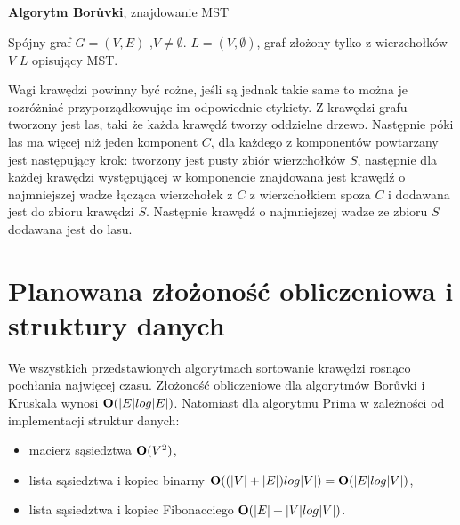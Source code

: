 \documentclass[a4paper, 10pt]{article}
\begin{document}
	
\begin{algorithm}
\caption{{\bf Algorytm Borůvki}, znajdowanie MST}
\begin{algorithmic}[!h]
\REQUIRE Spójny graf $G=(V,E)$ ,$V \neq \emptyset$. 
\ENSURE $L=(V,\emptyset)$, graf złożony tylko z wierzchołków $V$
\STATE {}
\STATE {}
\ENDFOR 
\ENDWHILE
\RETURN $L$ opisujący MST.
\end{algorithmic}
\end{algorithm}

\FloatBarrier

Wagi krawędzi powinny być rożne, jeśli są jednak takie same to można je rozróżniać przyporządkowując im odpowiednie etykiety.
Z krawędzi grafu tworzony jest las, taki że każda krawędź tworzy oddzielne drzewo. Następnie póki las ma więcej niż jeden komponent $C$, dla każdego
z komponentów powtarzany jest następujący krok: tworzony jest pusty zbiór wierzchołków $S$, następnie dla każdej krawędzi występującej w komponencie znajdowana
jest krawędź o najmniejszej wadze łącząca wierzchołek z $C$ z wierzchołkiem spoza $C$ i dodawana jest do zbioru krawędzi $S$. Następnie krawędź o najmniejszej wadze ze zbioru
$S$ dodawana jest do lasu.
\section{Planowana złożoność obliczeniowa i struktury danych}

We wszystkich przedstawionych algorytmach sortowanie krawędzi rosnąco pochłania 
najwięcej czasu. Złożoność obliczeniowe dla algorytmów Borůvki i Kruskala wynosi
 ${\bf O}(|E| log |E|)$. Natomiast dla algorytmu Prima w zależności od implementacji struktur danych:

\begin{itemize}
\item{macierz sąsiedztwa ${\bf O}(V^2)$,} 
\item{lista sąsiedztwa i kopiec binarny ${\bf O}((|V| + |E|) log |V|) = {\bf O}(|E| log |V|)$,}
\item{lista sąsiedztwa i kopiec Fibonacciego  	${\bf O}(|E| + |V| log |V|)$.} 
\end{itemize}
\end{document}
